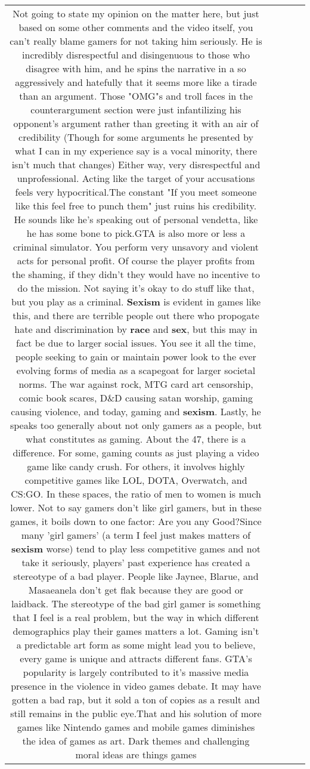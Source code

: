 \documentclass[11pt]{article}
\newlength\mylength
\begin{document}
\begin{center}
\begin{longtable}{|C{.65\mylength}|C{.30\mylength}|C{.12\mylength}|C{.12\mylength}|C{.12\mylength}|}
  \small Not going to state my opinion on the matter here, but just based on some other comments and the video itself, you can't really blame gamers for not taking him seriously. He is incredibly disrespectful and disingenuous to those who disagree with him, and he spins the narrative in a so aggressively and hatefully that it seems more like a tirade than an argument. Those "OMG"s and troll faces in the counterargument section were just infantilizing his opponent's argument rather than greeting it with an air of credibility (Though for some arguments he presented by what I can in my experience say is a vocal minority, there isn't much that changes) Either way, very disrespectful and unprofessional. Acting like the target of your accusations feels very hypocritical.The constant "If you meet someone like this feel free to punch them" just ruins his credibility. He sounds like he's speaking out of personal vendetta, like he has some bone to pick.GTA is also more or less a criminal simulator. You perform very unsavory and violent acts for personal profit. Of course the player profits from the shaming, if they didn't they would have no incentive to do the mission. Not saying it's okay to do stuff like that, but you play as a criminal. \textbf{Sexism} is evident in games like this, and there are terrible people out there who propogate hate and discrimination by \textbf{race} and \textbf{sex}, but this may in fact be due to larger social issues. You see it all the time, people seeking to gain or maintain power look to the ever evolving forms of media as a scapegoat for larger societal norms. The war against rock, MTG card art censorship, comic book scares, D\&D causing satan worship, gaming causing violence, and today, gaming and \textbf{sexism}. Lastly, he speaks too generally about not only gamers as a people, but what constitutes as gaming. About the 47, there is a difference. For some, gaming counts as just playing a video game like candy crush. For others, it involves highly competitive games like LOL, DOTA, Overwatch, and CS:GO. In these spaces, the ratio of men to women is much lower. Not to say gamers don't like girl gamers, but in these games, it boils down to one factor: Are you any Good?Since many 'girl gamers' (a term I feel just makes matters of \textbf{sexism} worse) tend to play less competitive games and not take it seriously, players' past experience has created a stereotype of a bad player. People like Jaynee, Blarue, and Masaeanela don't get flak because they are good or laidback. The stereotype of the bad girl gamer is something that I feel is a real problem, but the way in which different demographics play their games matters a lot. Gaming isn't a predictable art form as some might lead you to believe, every game is unique and attracts different fans. GTA's popularity is largely contributed to it's massive media presence in the violence in video games debate. It may have gotten a bad rap, but it sold a ton of copies as a result and still remains in the public eye.That and his solution of more games like Nintendo games and mobile games diminishes the idea of games as art. Dark themes and challenging moral ideas are things games 
\end{longtable}
\end{center}
\end{document}
